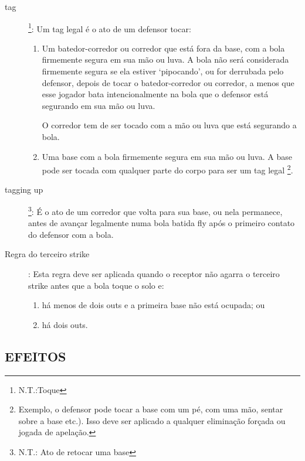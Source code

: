 \clearpage
\begin{description}	

	
	\item[\gls{tag}]\footnote{N.T.:Toque}: Um \gls{tag} legal \'e o ato de um defensor tocar: 
	
	\begin{enumerate}[label=\alph*)]
		\item Um batedor-corredor ou corredor que est\'a fora da base, com a bola firmemente segura em sua m\~ao ou luva. A bola n\~ao ser\'a considerada firmemente segura se ela estiver ‘pipocando', ou for derrubada pelo defensor, depois de tocar o batedor-corredor ou corredor, a menos que esse jogador bata intencionalmente na bola que o defensor est\'a segurando em sua m\~ao ou luva. 
		
		O corredor tem de ser tocado com a m\~ao ou luva que est\'a segurando a bola. 
		
		\item  Uma base com a bola firmemente segura em sua m\~ao ou luva. A base pode ser tocada com qualquer parte do corpo para ser um \gls{tag} legal \footnote{Exemplo, o defensor pode tocar a base com um p\'e, com uma m\~ao, sentar sobre a base etc.). Isso deve ser aplicado a qualquer elimina\c{c}\~ao for\c{c}ada ou jogada de apela\c{c}\~ao.}. 
	\end{enumerate}
	
	\item[\gls{tagging up}]\footnote{N.T.: Ato de retocar uma base}: \'E o ato de um corredor que volta para sua base, ou nela permanece, antes de avan\c{c}ar legalmente numa bola batida \gls{fly} ap\'os o primeiro contato do defensor com a bola. 
	
	\item[Regra do terceiro \gls{strike}]: Esta regra deve ser aplicada quando o receptor n\~ao agarra o terceiro \gls{strike} antes que a bola toque o solo e: 
	
	\begin{enumerate}[label=\alph*)]
		\item h\'a menos de dois \glspl{out} e a primeira base n\~ao est\'a ocupada; ou 
		
		\item  h\'a dois \glspl{out}. 
	\end{enumerate}


\end{description}

\subsection*{EFEITOS}

